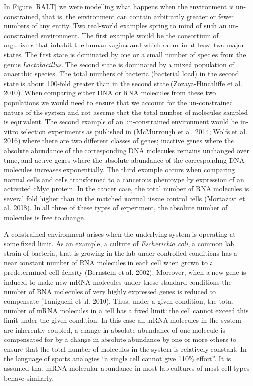 \documentclass[onecolumn]{article}
\begin{document}
In Figure \ref{RALT} we were modelling what happens when the environment is un-constrained, that is, the environment can contain arbitrarily greater or fewer numbers of any entity. Two real-world examples spring to mind of such an un-constrained environment. The first example would be the consortium of organisms that inhabit the human vagina and which occur in at least two major states. The first state is dominated by one or a small number of species from the genus \emph{Lactobacillus}. The second state is dominated by a mixed population of anaerobic species. The total numbers of bacteria (bacterial load) in the second state is about 100-fold greater than in the second state (Zozaya-Hinchliffe et al. 2010). When comparing either DNA or RNA molecules from these two populations we would need to ensure that we account for the un-constrained nature of the system and not assume that the total number of molecules sampled is equivalent. The second example of an un-constrained environment would be in-vitro selection experiments as published in (McMurrough et al. 2014; Wolfs et al. 2016) where there are two different classes of genes; inactive genes where the absolute abundance of the corresponding DNA molecules remains unchanged over time, and active genes where the absolute abundance of the corresponding DNA molecules increases exponentially. The third example occurs when comparing normal cells and cells transformed to a cancerous phentoype by expression of an activated cMyc protein. In the cancer case, the total number of RNA molecules is several fold higher than in the matched normal tissue control cells (Mortazavi et al. 2008). In all three of these types of experiment, the absolute number of molecules is free to change.

A constrained environment arises when the underlying system is operating at some fixed limit. As an example, a culture of \emph{Escherichia coli}, a common lab strain of bacteria, that is growing in the lab under controlled conditions has a near constant number of RNA molecules in each cell when grown to a predetermined cell density (Bernstein et al. 2002). Moreover, when a new gene is induced to make new mRNA molecules under these standard conditions the number of RNA molecules of very highly expressed genes is reduced to compensate (Taniguchi et al. 2010). Thus, under a given condition, the total number of mRNA molecules in a cell has a fixed limit: the cell cannot exceed this limit under the given condition. In this case all mRNA molecules in the system are inherently coupled, a change in absolute abundance of one molecule is compensated for by a change in absolute abundance by one or more others to ensure that the total number of molecules in the system is relatively constant. In the language of sports analogies ``a single cell cannot give 110\% effort''. It is assumed that mRNA molecular abundance in most lab cultures of most cell types behave similarly.
\end{document}
